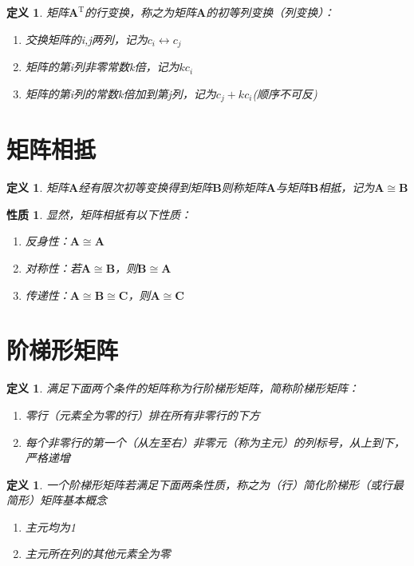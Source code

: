 \documentclass[12pt,oneside]{ctexbook}
\newtheorem{definition}[subsection]{定义}
\newtheorem{property}[subsection]{性质}
\begin{document}
\begin{definition}
    \kaishu 矩阵\(\mathbf{A}^\mathrm{T}\)的行变换，称之为矩阵\(\mathbf{A}\)的初等列变换（列变换）：
\begin{enumerate}
    \item 交换矩阵的i,j两列，记为\(c_i \leftrightarrow c_j \)
    \item 矩阵的第i列非零常数k倍，记为\(kc_i\)
    \item 矩阵的第i列的常数k倍加到第j列，记为\(c_j+kc_i\)(顺序不可反)
\end{enumerate}
\end{definition}
\section{矩阵相抵}
\begin{definition}
    矩阵\(\mathbf{A}\)经有限次初等变换得到矩阵\(\mathbf{B}\)则称矩阵\(\mathbf{A}\)与矩阵\(\mathbf{B}\)相抵，记为\(\mathbf{A}\cong \mathbf{B}\)
\end{definition}
\begin{property}
    显然，矩阵相抵有以下性质：
    \begin{enumerate}
        \item 反身性：\(\mathbf{A}\cong \mathbf{A}\)
        \item 对称性：若\(\mathbf{A}\cong \mathbf{B}\)，则\(\mathbf{B}\cong \mathbf{A}\)
        \item 传递性：\(\mathbf{A}\cong \mathbf{B}\cong \mathbf{C}\)，则\(\mathbf{A}\cong \mathbf{C}\)
    \end{enumerate}
\end{property}

\section{阶梯形矩阵}
\begin{definition}
    满足下面两个条件的矩阵称为行阶梯形矩阵，简称阶梯形矩阵：
\begin{enumerate}
    \item 零行（元素全为零的行）排在所有非零行的下方
    \item 每个非零行的第一个（从左至右）非零元（称为主元）的列标号，从上到下，严格递增
\end{enumerate}
\end{definition}
\begin{definition}
    一个阶梯形矩阵若满足下面两条性质，称之为（行）简化阶梯形（或行最简形）矩阵基本概念
\begin{enumerate}
    \item 主元均为1
    \item 主元所在列的其他元素全为零
\end{enumerate}
\end{definition}
\end{document}
